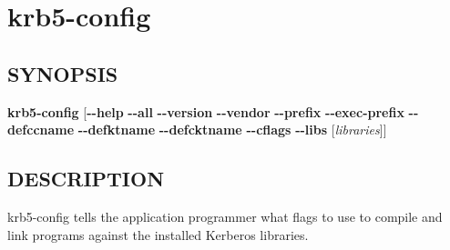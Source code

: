 \documentclass[letterpaper,10pt,english]{sphinxmanual}
\begin{document}
\section{krb5-config}
\label{user/user_commands/krb5-config:krb5-config-1}\label{user/user_commands/krb5-config:krb5-config}\label{user/user_commands/krb5-config::doc}

\subsection{SYNOPSIS}
\label{user/user_commands/krb5-config:synopsis}
\textbf{krb5-config}
{[}\textbf{-}\textbf{-help} \textbar{} \textbf{-}\textbf{-all} \textbar{} \textbf{-}\textbf{-version} \textbar{} \textbf{-}\textbf{-vendor} \textbar{} \textbf{-}\textbf{-prefix} \textbar{} \textbf{-}\textbf{-exec-prefix} \textbar{} \textbf{-}\textbf{-defccname} \textbar{} \textbf{-}\textbf{-defktname} \textbar{} \textbf{-}\textbf{-defcktname} \textbar{} \textbf{-}\textbf{-cflags} \textbar{} \textbf{-}\textbf{-libs} {[}\emph{libraries}{]}{]}


\subsection{DESCRIPTION}
\label{user/user_commands/krb5-config:description}
krb5-config tells the application programmer what flags to use to compile
and link programs against the installed Kerberos libraries.
\end{document}

